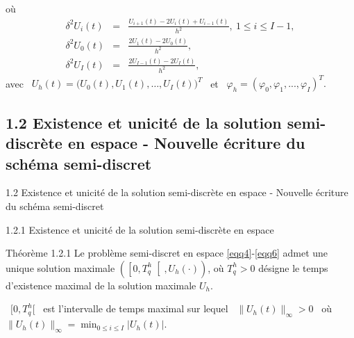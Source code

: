 \documentclass[10pt]{beamer}
\begin{document}
  \begin{frame}
  où
 \begin{eqnarray*}
		\delta^{2}U_{i}(t)&=&\frac{U_{i+1}(t)-2U_{i}(t)+U_{i-1}(t)}{h^{2}}, \ 1\leqslant i\leqslant I-1,\\ \delta^{2}U_{0}(t)&=&\frac{2U_{1}(t)-2U_{0}(t)}{h^{2}},\\
		\delta^{2}U_{I}(t)&=&\frac{2U_{I-1}(t)-2U_{I}(t)}{h^{2}},
\end{eqnarray*}
avec \ $ U_{h}(t)=\big(U_{0}(t),U_{1}(t),\ldots,U_{I}(t)\big)^{T}$ \ et \ $\varphi_h=\left(\varphi_0,\varphi_1,...,\varphi_I\right)^{T}. $ \

     

\end{frame}

\begin{frame}
\subsection{1.2 Existence et unicité de la solution semi-discrète en espace - Nouvelle écriture du schéma semi-discret}
\begin{block}{1.2 Existence et unicité de la solution semi-discrète en espace - Nouvelle écriture du schéma semi-discret}\end{block}
\begin{block}{1.2.1 Existence et unicité de la solution semi-discrète en espace }\end{block} 
  \begin{block}{Théorème 1.2.1 }
Le problème semi-discret en espace \eqref{eqq4}-\eqref{eqq6} admet une unique solution maximale
	$\left(\left[0,T_{q}^{h}\right[,U_{h}(\cdot)\right)$, où
	$T_{q}^{h}>0$ désigne le temps d'existence maximal de la solution
	maximale $U_{h}$.
\end{block}
\end{frame}


\begin{frame}
\begin{block}
     \ $[0,T^{h}_{q}[$ \ est l'intervalle de temps maximal sur lequel \ $\lVert U_h(t) \rVert_\infty >0$ \ où \ $\lVert U_h(t) \rVert_\infty= \displaystyle\min_{ 0\leqslant i\leqslant I}\lvert U_h(t)\rvert.$ \ \\ 
\noindent{}\\
  \end{block}
\end{frame}
\end{document}
